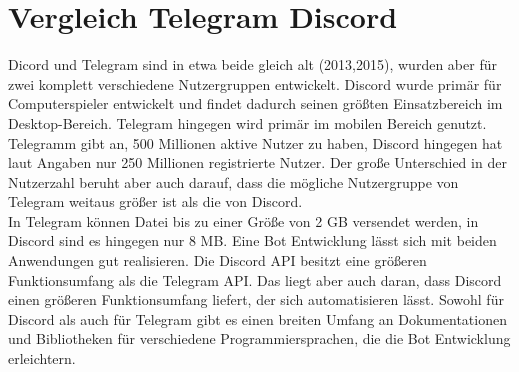 \documentclass[sigplan,screen]{acmart}
\begin{document}
\section{Vergleich Telegram Discord}
Dicord und Telegram sind in etwa beide gleich alt (2013,2015), wurden aber für zwei komplett verschiedene Nutzergruppen entwickelt. Discord wurde primär für Computerspieler entwickelt und findet dadurch seinen größten Einsatzbereich im Desktop-Bereich.\cite{dis1} Telegram hingegen wird primär im mobilen Bereich genutzt. \cite{tele0} Telegramm gibt an, 500 Millionen aktive Nutzer zu haben, \cite{telenutzer} Discord hingegen hat laut Angaben nur 250 Millionen registrierte Nutzer. \cite{disconutzer} Der große Unterschied in der Nutzerzahl beruht aber auch darauf, dass die mögliche Nutzergruppe von Telegram weitaus größer ist als die von Discord. \\
\noindent In Telegram können Datei bis zu einer Größe von 2 GB versendet werden, in Discord sind es hingegen nur 8 MB. Eine Bot Entwicklung lässt sich mit beiden Anwendungen gut realisieren. Die Discord API besitzt eine größeren Funktionsumfang als die Telegram API. Das liegt aber auch daran, dass Discord einen größeren Funktionsumfang liefert, der sich automatisieren lässt. Sowohl für Discord als auch für Telegram gibt es einen breiten Umfang an Dokumentationen und Bibliotheken für verschiedene Programmiersprachen, die die Bot Entwicklung erleichtern. 
\end{document}
